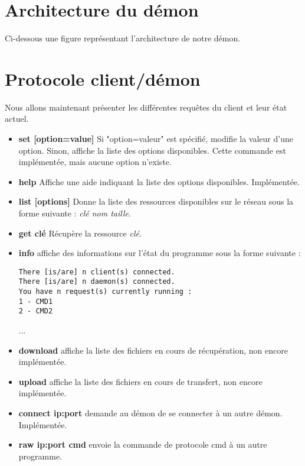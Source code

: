 	\section{Architecture du démon}
Ci-dessous une figure représentant l'architecture de notre démon.
	
    \section{Protocole client/démon}\label{protclient}
    Nous allons maintenant présenter les différentes requêtes du client et leur
 état actuel.

\begin{itemize}
\item{\textbf{set [option=value]}} Si "option=valeur" est spécifié, modifie la
 valeur
d'une option. Sinon, affiche la liste des options disponibles. Cette commande
est implémentée, mais aucune option n'existe.

\item{\textbf{help}} Affiche une aide indiquant la liste des options
disponibles. Implémentée.

\item{\textbf{list [options]}} Donne la liste des ressources disponibles sur
le réseau sous la forme suivante : \textit{clé nom taille}.

\item{\textbf{get clé}} Récupère la ressource \textit{clé}.

\item{\textbf{info}} affiche des informations sur l'état du programme sous la
forme suivante :
\begin{verbatim}
There [is/are] n client(s) connected.
There [is/are] n daemon(s) connected.
You have n request(s) currently running :
1 - CMD1
2 - CMD2
\end{verbatim}
...

\item{\textbf{download}} affiche la liste des fichiers en cours de récupération,
 non encore implémentée.

\item{\textbf{upload}} affiche la liste des fichiers en cours de transfert, non
 encore implémentée.

\item{\textbf{connect ip:port}} demande au démon de se connecter à un autre
démon. Implémentée.

\item{\textbf{raw ip:port cmd}} envoie la commande de protocole cmd à un autre
 programme.

\end{itemize} 
	
